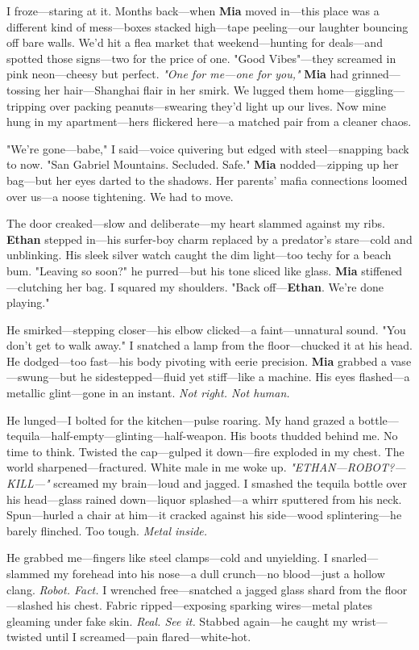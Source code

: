 \documentclass{article}
\begin{document}
I froze—staring at it. Months back—when \textbf{Mia} moved in—this place was a different kind of mess—boxes stacked high—tape peeling—our laughter bouncing off bare walls. We’d hit a flea market that weekend—hunting for deals—and spotted those signs—two for the price of one. "Good Vibes"—they screamed in pink neon—cheesy but perfect. \textit{"One for me—one for you,"} \textbf{Mia} had grinned—tossing her hair—Shanghai flair in her smirk. We lugged them home—giggling—tripping over packing peanuts—swearing they’d light up our lives. Now mine hung in my apartment—hers flickered here—a matched pair from a cleaner chaos.

"We’re gone—babe," I said—voice quivering but edged with steel—snapping back to now. "San Gabriel Mountains. Secluded. Safe." \textbf{Mia} nodded—zipping up her bag—but her eyes darted to the shadows. Her parents’ mafia connections loomed over us—a noose tightening. We had to move.

The door creaked—slow and deliberate—my heart slammed against my ribs. \textbf{Ethan} stepped in—his surfer-boy charm replaced by a predator’s stare—cold and unblinking. His sleek silver watch caught the dim light—too techy for a beach bum. "Leaving so soon?" he purred—but his tone sliced like glass. \textbf{Mia} stiffened—clutching her bag. I squared my shoulders. "Back off—\textbf{Ethan}. We’re done playing."

He smirked—stepping closer—his elbow clicked—a faint—unnatural sound. "You don’t get to walk away." I snatched a lamp from the floor—chucked it at his head. He dodged—too fast—his body pivoting with eerie precision. \textbf{Mia} grabbed a vase—swung—but he sidestepped—fluid yet stiff—like a machine. His eyes flashed—a metallic glint—gone in an instant. \textit{Not right. Not human.}

He lunged—I bolted for the kitchen—pulse roaring. My hand grazed a bottle—tequila—half-empty—glinting—half-weapon. His boots thudded behind me. No time to think. Twisted the cap—gulped it down—fire exploded in my chest. The world sharpened—fractured. White male in me woke up. \textit{"ETHAN—ROBOT?—KILL—"} screamed my brain—loud and jagged. I smashed the tequila bottle over his head—glass rained down—liquor splashed—a whirr sputtered from his neck. Spun—hurled a chair at him—it cracked against his side—wood splintering—he barely flinched. Too tough. \textit{Metal inside.}

He grabbed me—fingers like steel clamps—cold and unyielding. I snarled—slammed my forehead into his nose—a dull crunch—no blood—just a hollow clang. \textit{Robot. Fact.} I wrenched free—snatched a jagged glass shard from the floor—slashed his chest. Fabric ripped—exposing sparking wires—metal plates gleaming under fake skin. \textit{Real. See it.} Stabbed again—he caught my wrist—twisted until I screamed—pain flared—white-hot.
\end{document}
